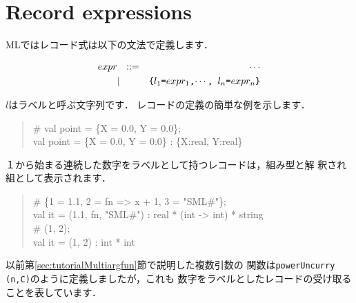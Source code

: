 \documentclass{jbook}
\newcommand{\txt}[2]{#2}
\begin{document}
\section{\txt{レコード構文}{Record expressions}}
\label{sec:extensionRecordExpression}

\ifjp%
	MLではレコード式は以下の文法で定義します．
\begin{tt}
\begin{eqnarray*}
expr &\mbox{\ \ }::=& \cdots \\
     &|& \mbox{\tt \{$l_1$=$expr_1$,$\cdots$, $l_n$=$expr_n$\}}
\end{eqnarray*}
\end{tt}
	$l$はラベルと呼ぶ文字列です．
	レコードの定義の簡単な例を示します．
\begin{tt}
\begin{quote}
\# val point = \{X = 0.0, Y = 0.0\};\\
val point = \{X = 0.0, Y = 0.0\} : \{X:real, Y:real\}
\end{quote}
\end{tt}
	１から始まる連続した数字をラベルとして持つレコードは，組み型と解
釈され組として表示されます．
\begin{tt}
\begin{quote}
\#  \{1 = 1.1, 2 = fn => x + 1, 3 = "SML\#"\};\\
val it = (1.1, fn, "SML\#") : real * (int -> int) * string\\
\# (1, 2);\\
val it = (1, 2) : int * int
\end{quote}
\end{tt}
	以前第\ref{sec:tutorialMultiargfun}節で説明した複数引数の
関数は{\tt powerUncurry (n,C)}のように定義しましたが，これも
数字をラベルとしたレコードの受け取ることを表しています．
\end{document}
